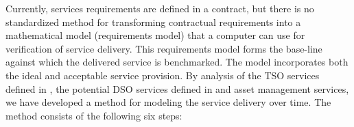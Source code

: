 Currently, services requirements are defined in a contract, but there is no standardized method for transforming contractual requirements into a mathematical model (requirements model) that a computer can use for verification of service delivery. This requirements model forms the base-line against which the delivered service is benchmarked. The model incorporates both the ideal and acceptable service provision. By analysis of the TSO services defined in \cite{EnerginetAncillary}, the potential DSO services defined in \cite{ding2013development} and asset management services, we have developed a method for modeling the service delivery over time. 
The method consists of the following six steps:
